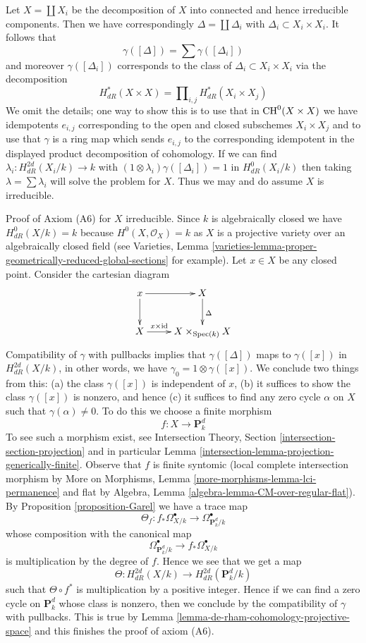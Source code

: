 \medskip\noindent
Let $X = \coprod X_i$ be the decomposition of $X$ into connected
and hence irreducible components. Then we have correspondingly
$\Delta = \coprod \Delta_i$ with $\Delta_i \subset X_i \times X_i$.
It follows that
$$
\gamma([\Delta]) = \sum \gamma([\Delta_i])
$$
and moreover $\gamma([\Delta_i])$ corresponds to the class of
$\Delta_i \subset X_i \times X_i$ via the decomposition
$$
H^*_{dR}(X \times X) = \prod\nolimits_{i, j} H^*_{dR}(X_i \times X_j)
$$
We omit the details; one way to show this is to use that in
$\mathop{\mathrm{CH}}\nolimits^0(X \times X)$ we have idempotents $e_{i, j}$ corresponding to
the open and closed subschemes $X_i \times X_j$ and to use that
$\gamma$ is a ring map which sends $e_{i, j}$ to the corresponding
idempotent in the displayed product decomposition of cohomology.
If we can find $\lambda_i : H_{dR}^{2d}(X_i/k) \to k$ with
$(1 \otimes \lambda_i)\gamma([\Delta_i]) = 1$ in $H^0_{dR}(X_i/k)$
then taking $\lambda = \sum \lambda_i$ will solve the problem for $X$.
Thus we may and do assume $X$ is irreducible.

\medskip\noindent
Proof of Axiom (A6) for $X$ irreducible. Since $k$ is algebraically
closed we have $H^0_{dR}(X/k) = k$ because $H^0(X, \mathcal{O}_X) = k$
as $X$ is a projective variety over an algebraically closed field
(see Varieties, Lemma
\ref{varieties-lemma-proper-geometrically-reduced-global-sections}
for example). Let $x \in X$ be any closed point.
Consider the cartesian diagram
$$
\xymatrix{
x \ar[d] \ar[r] & X \ar[d]^\Delta \\
X \ar[r]^-{x \times \text{id}} & X \times_{\Spec(k)} X
}
$$
Compatibility of $\gamma$ with pullbacks implies that
$\gamma([\Delta])$ maps to $\gamma([x])$ in $H_{dR}^{2d}(X/k)$,
in other words, we have $\gamma_0 = 1 \otimes \gamma([x])$.
We conclude two things from this: (a) the class
$\gamma([x])$ is independent of $x$, (b) it suffices
to show the class $\gamma([x])$ is nonzero, and hence (c)
it suffices to find any zero cycle $\alpha$ on $X$ such that
$\gamma(\alpha) \not = 0$. To do this we choose a finite
morphism
$$
f : X \longrightarrow \mathbf{P}^d_k
$$
To see such a morphism exist, see
Intersection Theory, Section \ref{intersection-section-projection}
and in particular Lemma \ref{intersection-lemma-projection-generically-finite}.
Observe that $f$ is finite syntomic (local complete intersection morphism
by More on Morphisms, Lemma \ref{more-morphisms-lemma-lci-permanence}
and flat by Algebra, Lemma \ref{algebra-lemma-CM-over-regular-flat}).
By Proposition \ref{proposition-Garel} we have a trace map
$$
\Theta_f :
f_*\Omega^\bullet_{X/k}
\longrightarrow
\Omega^\bullet_{\mathbf{P}^d_k/k}
$$
whose composition with the canonical map
$$
\Omega^\bullet_{\mathbf{P}^d_k/k}
\longrightarrow
f_*\Omega^\bullet_{X/k}
$$
is multiplication by the degree of $f$. Hence we see that we get a map
$$
\Theta : H_{dR}^{2d}(X/k) \to H_{dR}^{2d}(\mathbf{P}^d_k/k)
$$
such that $\Theta \circ f^*$ is multiplication by a positive integer.
Hence if we can find a zero cycle on $\mathbf{P}^d_k$ whose class
is nonzero, then we conclude by the compatibility of $\gamma$
with pullbacks. This is true by
Lemma \ref{lemma-de-rham-cohomology-projective-space} and this
finishes the proof of axiom (A6).


